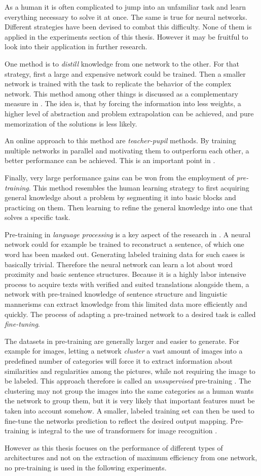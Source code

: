 As a human it is often complicated to jump into an unfamiliar task and learn everything necessary to solve it at once.
The same is true for neural networks. 
Different strategies have been devised to combat this difficulty. 
None of them is applied in the experiments section of this thesis. 
However it may be fruitful to look into their application in further research. 

One method is to \emph{distill} knowledge from one network to the other. 
For that strategy, first a large and expensive network could be trained.
Then a smaller network is trained with the task to replicate the behavior of the complex network. 
This method among other things is discussed as a complementary measure in \cite{mobileNetPaper}.
The idea is, that by forcing the information into less weights, a higher level of abstraction and problem extrapolation can be achieved, and pure memorization of the solutions is less likely.

An \glqq online\grqq{} approach to this method are \emph{teacher-pupil} methods. 
By training multiple networks in parallel and motivating them to outperform each other, a better performance can be achieved. This is an important point in \cite{dinoPaper}.

Finally, very large performance gains can be won from the employment of \emph{pre-training}.
This method resembles the human learning strategy to first acquiring general knowledge about a problem by segmenting it into basic blocks and practicing on them.
Then learning to refine the general knowledge into one that solves a specific task.

Pre-training in \emph{language processing} is a key aspect of the research in \cite{bertPaper}.
A neural network could for example be trained to reconstruct a sentence, of which one word has been masked out.
Generating labeled training data for such cases is basically trivial. 
Therefore the neural network can learn a lot about word proximity and basic sentence structures.
Because it is a highly labor intensive process to acquire texts with verified and suited translations alongside them, a network with pre-trained knowledge of sentence structure and linguistic mannerisms can extract knowledge from this limited data more efficiently and quickly.
The process of adapting a pre-trained network to a desired task is called \emph{fine-tuning}.

The datasets in pre-training are generally larger and easier to generate. 
For example for images, letting a network \emph{cluster} a vast amount of images into a predefined number of categories will force it to extract information about similarities and regularities among the pictures, while not requiring the image to be labeled. This approach therefore is called an \emph{unsupervised} pre-training \cite{dinoPaper}. 
The clustering may not group the images into the same categories as a human wants the network to group them, but it is very likely that important features must be taken into account somehow. 
A smaller, labeled training set can then be used to fine-tune the networks prediction to reflect the desired output mapping. 
Pre-training is integral to the use of transformers for image recognition \cite{imageWorth16x16}. 

However as this thesis focuses on the performance of different types of architectures and not on the extraction of maximum efficiency from one network, no pre-training is used in the following experiments.
